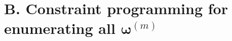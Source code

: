 \documentclass[useAMS, usenatbib, referee]{biom}\usepackage[]{graphicx}\usepackage[]{color}
\begin{document}






\vspace{-12pt}

\section{B. Constraint programming for enumerating all $\bm{\omega}^{(m)}$}
\label{appx:constrprog}
\end{document}
